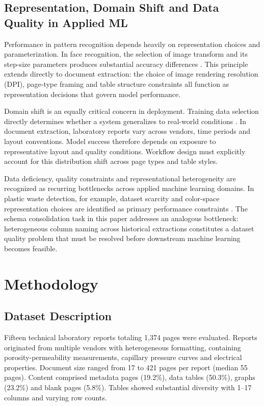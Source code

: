 \documentclass[conference]{IEEEtran}
\begin{document}
\subsection{Representation, Domain Shift and Data Quality in Applied ML}

Performance in pattern recognition depends heavily on representation choices and parameterization. In face recognition, the selection of image transform and its step-size parameters produces substantial accuracy differences \cite{dargham2010}. This principle extends directly to document extraction: the choice of image rendering resolution (DPI), page-type framing and table structure constraints all function as representation decisions that govern model performance.

Domain shift is an equally critical concern in deployment. Training data selection directly determines whether a system generalizes to real-world conditions \cite{dargham2015}. In document extraction, laboratory reports vary across vendors, time periods and layout conventions. Model success therefore depends on exposure to representative layout and quality conditions. Workflow design must explicitly account for this distribution shift across page types and table styles.

Data deficiency, quality constraints and representational heterogeneity are recognized as recurring bottlenecks across applied machine learning domains. In plastic waste detection, for example, dataset scarcity and color-space representation choices are identified as primary performance constraints \cite{tamin2022}. The schema consolidation task in this paper addresses an analogous bottleneck: heterogeneous column naming across historical extractions constitutes a dataset quality problem that must be resolved before downstream machine learning becomes feasible.

\section{Methodology}

\subsection{Dataset Description}

Fifteen technical laboratory reports totaling 1,374 pages were evaluated. Reports originated from multiple vendors with heterogeneous formatting, containing porosity-permeability measurements, capillary pressure curves and electrical properties. Document size ranged from 17 to 421 pages per report (median 55 pages). Content comprised metadata pages (19.2\%), data tables (50.3\%), graphs (23.2\%) and blank pages (5.8\%). Tables showed substantial diversity with 1--17 columns and varying row counts.
\end{document}
